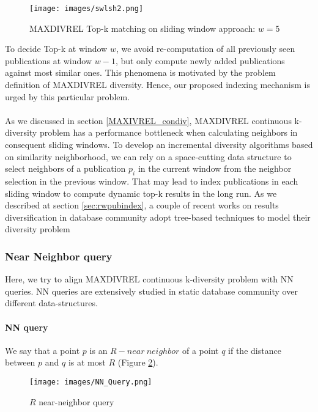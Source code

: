 \documentclass[a4paper,12pt,oneside]{book}
\theoremstyle{definition}
\theoremstyle{remark}
\begin{document}
\begin{figure}[h]
\begin{center}
\texttt{[image: images/swlsh2.png]}
\caption{MAXDIVREL Top-k matching on sliding window approach: $w = 5$}
\label{img:incsw2}
\end{center}
\end{figure}

To decide Top-k at window $w$, we avoid re-computation of all previously seen publications at window $w-1$, but only compute newly added publications against most similar ones. This phenomena is motivated by the problem definition of MAXDIVREL diversity. Hence, our proposed indexing mechanism is urged by this particular problem.

\paragraph*{}
As we discussed in section \ref{MAXIVREL_condiv}, MAXDIVREL continuous k-diversity problem has a performance bottleneck when calculating neighbors in consequent sliding windows. To develop an incremental diversity algorithms based on similarity neighborhood, we can rely on a space-cutting data structure to select neighbors of a publication $p_i$ in the current window from the neighbor selection in the previous window. That may lead to index publications in each sliding window to compute dynamic top-k results in the long run. As we described at section \ref{sec:rwpubindex}, a couple of recent works on results diversification in database community adopt tree-based techniques to model their diversity problem \cite{Drosou2014ExtendedDiversity,Rao2012}

\subsubsection{Near Neighbor query}
Here, we try to align MAXDIVREL continuous k-diversity problem with \acf{NN} queries. \ac{NN} queries are extensively studied in static database community over different data-structures. 

\paragraph*{\acf{NN} query}
We say that a point $p$ is an $R-near\ neighbor$ of a point $q$ if the distance between $p$ and $q$ is at most $R$ (Figure \ref{img:rnn}).

\begin{figure}[h]
\begin{center}
\texttt{[image: images/NN\_Query.png]}
\caption{$R$ near-neighbor query}
\label{img:rnn}
\end{center}
\end{figure}
\end{document}

